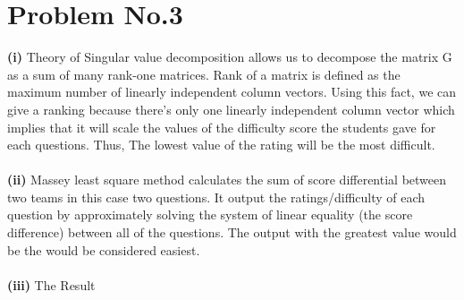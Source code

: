 \section*{Problem No.3} \label{sec:prob3}

\textbf{(i)} Theory of Singular value decomposition allows us to decompose the matrix G as a sum of many rank-one matrices. Rank of a matrix is defined as the maximum number of linearly independent column vectors. Using this fact, we can give a ranking because there's only one linearly independent column vector which implies that it will scale the values of the difficulty score the students gave for each questions. Thus, The lowest value of the rating will be the most difficult.
\\
\\
\textbf{(ii)} 
Massey least square method calculates the sum of score differential between two teams in this case two questions. It output the ratings/difficulty of each question by approximately solving the system of linear equality (the score difference) between all of the questions. The output with the greatest value would be the would be considered easiest. 
\\
\\
\textbf{(iii)} The Result
